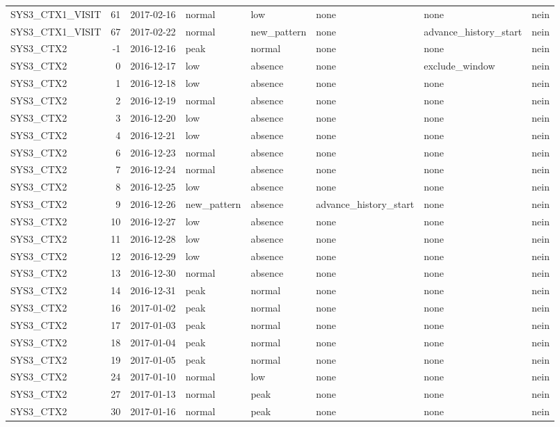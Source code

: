 \begin{tabular}{lrllllll}
SYS3\_CTX1\_VISIT & 61 & 2017-02-16 & normal & low & none & none & nein \\
SYS3\_CTX1\_VISIT & 67 & 2017-02-22 & normal & new\_pattern & none & advance\_history\_start & nein \\
SYS3\_CTX2 & -1 & 2016-12-16 & peak & normal & none & none & nein \\
SYS3\_CTX2 & 0 & 2016-12-17 & low & absence & none & exclude\_window & nein \\
SYS3\_CTX2 & 1 & 2016-12-18 & low & absence & none & none & nein \\
SYS3\_CTX2 & 2 & 2016-12-19 & normal & absence & none & none & nein \\
SYS3\_CTX2 & 3 & 2016-12-20 & low & absence & none & none & nein \\
SYS3\_CTX2 & 4 & 2016-12-21 & low & absence & none & none & nein \\
SYS3\_CTX2 & 6 & 2016-12-23 & normal & absence & none & none & nein \\
SYS3\_CTX2 & 7 & 2016-12-24 & normal & absence & none & none & nein \\
SYS3\_CTX2 & 8 & 2016-12-25 & low & absence & none & none & nein \\
SYS3\_CTX2 & 9 & 2016-12-26 & new\_pattern & absence & advance\_history\_start & none & nein \\
SYS3\_CTX2 & 10 & 2016-12-27 & low & absence & none & none & nein \\
SYS3\_CTX2 & 11 & 2016-12-28 & low & absence & none & none & nein \\
SYS3\_CTX2 & 12 & 2016-12-29 & low & absence & none & none & nein \\
SYS3\_CTX2 & 13 & 2016-12-30 & normal & absence & none & none & nein \\
SYS3\_CTX2 & 14 & 2016-12-31 & peak & normal & none & none & nein \\
SYS3\_CTX2 & 16 & 2017-01-02 & peak & normal & none & none & nein \\
SYS3\_CTX2 & 17 & 2017-01-03 & peak & normal & none & none & nein \\
SYS3\_CTX2 & 18 & 2017-01-04 & peak & normal & none & none & nein \\
SYS3\_CTX2 & 19 & 2017-01-05 & peak & normal & none & none & nein \\
SYS3\_CTX2 & 24 & 2017-01-10 & normal & low & none & none & nein \\
SYS3\_CTX2 & 27 & 2017-01-13 & normal & peak & none & none & nein \\
SYS3\_CTX2 & 30 & 2017-01-16 & normal & peak & none & none & nein \\

\end{tabular}
